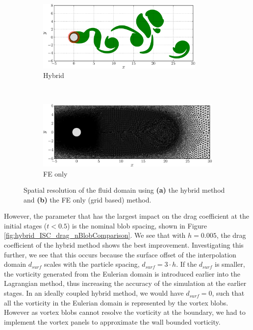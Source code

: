 	\begin{figure}[!p]
     \centering
     \begin{subfigure}[t]{0.49\textwidth}
             \includegraphics[width=0.9\textwidth]{./figures/validation/isc/hybrid_ISC_blobsLoc-crop.png}
             \caption{Hybrid}
             \label{fig:hybrid_ISC_blobsLoc-crop}
     \end{subfigure}%
     ~ %
     \begin{subfigure}[t]{0.49\textwidth}
             \includegraphics[width=\textwidth]{./figures/validation/isc/FE_ISC_mesh-crop.png}
             \caption{FE only}
             \label{fig:FE_ISC_mesh-crop}
     \end{subfigure}
     \caption{Spatial resolution of the fluid domain using \textbf{(a)} the hybrid method and \textbf{(b)} the FE only (grid based) method.}
     \label{fig:hybrid_gridResolution}
	\end{figure}	


However, the parameter that has the largest impact on the drag coefficient at the initial stages ($t<0.5$) is the nominal blob spacing, shown in Figure \ref{fig:hybrid_ISC_drag_nBlobComparison}. We see that with $h=0.005$, the drag coefficient of the hybrid method shows the best improvement. Investigating this further, we see that this occurs because the surface offset of the interpolation domain $d_{surf}$ scales with the particle spacing, $d_{surf}=3\cdot{h}$. If the $d_{surf}$ is smaller, the vorticity generated from the Eulerian domain is introduced earlier into the Lagrangian method, thus increasing the accuracy of the simulation at the earlier stages. In an ideally coupled hybrid method, we would have $d_{surf}=0$, such that all the vorticity in the Eulerian domain is represented by the vortex blobs. However as vortex blobs cannot resolve the vorticity at the boundary, we had to implement the vortex panels to approximate the wall bounded vorticity.

